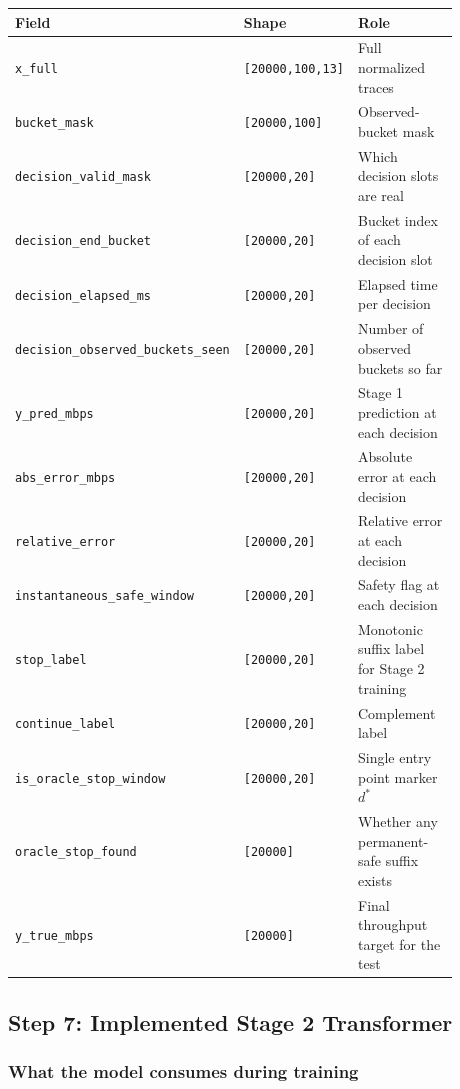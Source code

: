 \documentclass[11pt]{article}
\newcommand{\toprule}{\hline}
\newcommand{\midrule}{\hline}
\newcommand{\bottomrule}{\hline}
\begin{document}
\begin{center}
\begin{tabular}{p{0.38\linewidth} p{0.20\linewidth} p{0.30\linewidth}}
\toprule
\textbf{Field} & \textbf{Shape} & \textbf{Role} \\
\midrule
\texttt{x\_full} & \texttt{[20000,100,13]} & Full normalized traces \\
\texttt{bucket\_mask} & \texttt{[20000,100]} & Observed-bucket mask \\
\texttt{decision\_valid\_mask} & \texttt{[20000,20]} & Which decision slots are real \\
\texttt{decision\_end\_bucket} & \texttt{[20000,20]} & Bucket index of each decision slot \\
\texttt{decision\_elapsed\_ms} & \texttt{[20000,20]} & Elapsed time per decision \\
\texttt{decision\_observed\_buckets\_seen} & \texttt{[20000,20]} & Number of observed buckets so far \\
\texttt{y\_pred\_mbps} & \texttt{[20000,20]} & Stage 1 prediction at each decision \\
\texttt{abs\_error\_mbps} & \texttt{[20000,20]} & Absolute error at each decision \\
\texttt{relative\_error} & \texttt{[20000,20]} & Relative error at each decision \\
\texttt{instantaneous\_safe\_window} & \texttt{[20000,20]} & Safety flag at each decision \\
\texttt{stop\_label} & \texttt{[20000,20]} & Monotonic suffix label for Stage 2 training \\
\texttt{continue\_label} & \texttt{[20000,20]} & Complement label \\
\texttt{is\_oracle\_stop\_window} & \texttt{[20000,20]} & Single entry point marker \(d^{*}\) \\
\texttt{oracle\_stop\_found} & \texttt{[20000]} & Whether any permanent-safe suffix exists \\
\texttt{y\_true\_mbps} & \texttt{[20000]} & Final throughput target for the test \\
\bottomrule
\end{tabular}
\end{center}

\subsection{Step 7: Implemented Stage 2 Transformer}

\subsubsection*{What the model consumes during training}
\end{document}
